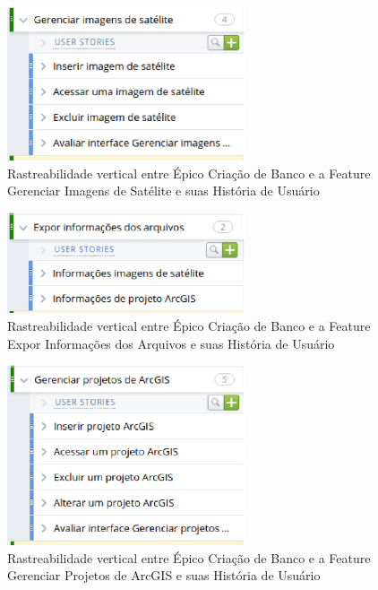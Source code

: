  \begin{figure}[!htb]
    \centering
    \includegraphics[width=7cm, keepaspectratio=false]{figuras/rastreabilidade/vertical/feature_gerenciar_imagens.eps}
    \caption{Rastreabilidade vertical entre Épico Criação de Banco e a Feature Gerenciar Imagens de Satélite e suas História de Usuário}
  \end{figure}

  \begin{figure}[!htb]
    \centering
    \includegraphics[width=7cm, keepaspectratio=false]{figuras/rastreabilidade/vertical/feature_expor.eps}
    \caption{Rastreabilidade vertical entre Épico Criação de Banco e a Feature Expor Informações dos Arquivos e suas História de Usuário}
  \end{figure}

  \begin{figure}[!htb]
    \centering
    \includegraphics[width=7cm, keepaspectratio=false]{figuras/rastreabilidade/vertical/feature_gerenciar_projeto.eps}
    \caption{Rastreabilidade vertical entre Épico Criação de Banco e a Feature Gerenciar Projetos de ArcGIS e suas História de Usuário}
  \end{figure}

